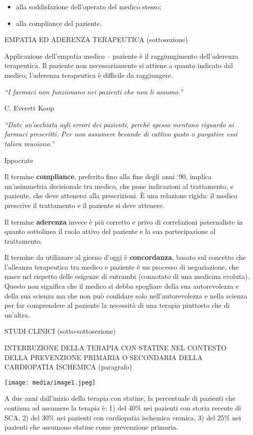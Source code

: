 \documentclass[]{article}
\begin{document}
\begin{itemize}
\item
  alla soddisfazione dell'operato del medico stesso;
\item
  alla compliance del paziente.
\end{itemize}

EMPATIA ED ADERENZA TERAPEUTICA (sottosezione)

Applicazione dell'empatia medico -- paziente è il raggiungimento
dell'aderenza terapeutica. Il paziente non necessariamente si attiene a
quanto indicato dal medico, l'aderenza terapeutica è difficile da
raggiungere.

\emph{``I farmaci non funzionano nei pazienti che non li assumo.''}

C. Everett Koop

\emph{``Date un'occhiata agli errori dei pazienti, perché spesso mentono
riguardo ai farmaci prescritti. Per non assumere bevande di cattivo
gusto o purgative essi talora muoiono.''}

Ippocrate

Il termine \textbf{compliance}, preferito fino alla fine degli anni `90,
implica un'asimmetria decisionale tra medico, che pone indicazioni al
trattamento, e paziente, che deve attenersi alla prescrizioni. È una
relazione rigida: il medico prescrive il trattamento e il paziente si
deve attenere.

Il termine \textbf{aderenza} invece è più corretto e privo di
correlazioni paternaliste in quanto sottolinea il ruolo attivo del
paziente e la sua partecipazione al trattamento.

Il termine da utilizzare al giorno d'oggi è \textbf{concordanza}, basato
sul concetto che l'alleanza terapeutica tra medico e paziente è un
processo di negoziazione, che nasce nel rispetto delle esigenze di
entrambi (connotato di una medicina evoluta). Questo non significa che
il medico si debba spogliare della sua autorevolezza e della sua scienza
ma che non può confidare solo nell'autorevolezza e nella scienza per far
comprendere al paziente la necessità di una terapia piuttosto che di
un'altra.

STUDI CLINICI (sotto-sottosezione)

INTERRUZIONE DELLA TERAPIA CON STATINE NEL CONTESTO DELLA PREVENZIONE
PRIMARIA O SECONDARIA DELLA CARDIOPATIA ISCHEMICA (paragrafo)

\texttt{[image: media/image1.jpeg]}

A due anni dall'inizio della terapia con statine, la percentuale di
pazienti che continua ad assumere la terapia è: 1) del 40\% nei pazienti
con storia recente di SCA, 2) del 30\% nei pazienti con cardiopatia
ischemica cronica, 3) del 25\% nei pazienti che assumono statine come
prevenzione primaria.
\end{document}
